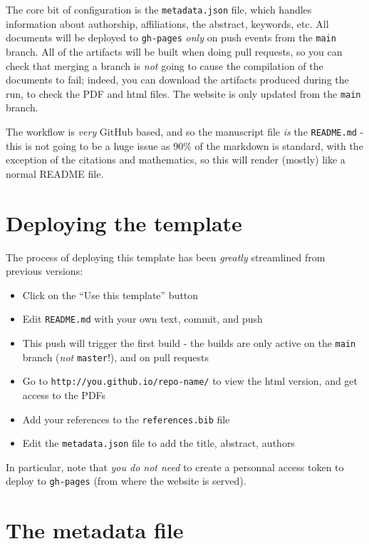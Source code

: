 \documentclass[11pt]{article}
\begin{document}
The core bit of configuration is the \texttt{metadata.json} file, which
handles information about authorship, affiliations, the abstract,
keywords, etc. All documents will be deployed to \texttt{gh-pages}
\emph{only} on push events from the \texttt{main} branch. All of the
artifacts will be built when doing pull requests, so you can check that
merging a branch is \emph{not} going to cause the compilation of the
documents to fail; indeed, you can download the artifacts produced
during the run, to check the PDF and html files. The website is only
updated from the \texttt{main} branch.

The workflow is \emph{very} GitHub based, and so the manuscript file
\emph{is} the \texttt{README.md} - this is not going to be a huge issue
as 90\% of the markdown is standard, with the exception of the citations
and mathematics, so this will render (mostly) like a normal README file.

\hypertarget{deploying-the-template}{%
\section{Deploying the template}\label{deploying-the-template}}

The process of deploying this template has been \emph{greatly}
streamlined from previous versions:

\begin{itemize}
\tightlist
\item
  Click on the ``Use this template'' button
\item
  Edit \texttt{README.md} with your own text, commit, and push
\item
  This push will trigger the first build - the builds are only active on
  the \texttt{main} branch (\emph{not} \texttt{master}!), and on pull
  requests
\item
  Go to \texttt{http://you.github.io/repo-name/} to view the html
  version, and get access to the PDFs
\item
  Add your references to the \texttt{references.bib} file
\item
  Edit the \texttt{metadata.json} file to add the title, abstract,
  authors
\end{itemize}

In particular, note that \emph{you do not need} to create a personnal
access token to deploy to \texttt{gh-pages} (from where the website is
served).

\hypertarget{the-metadata-file}{%
\section{The metadata file}\label{the-metadata-file}}
\end{document}
